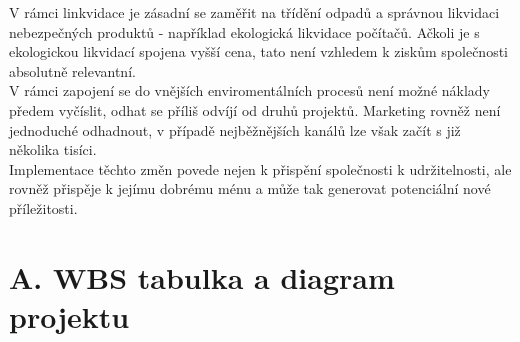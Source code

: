 V rámci linkvidace je zásadní se zaměřit na třídění odpadů a správnou likvidaci nebezpečných produktů - například ekologická likvidace počítačů. Ačkoli je s ekologickou likvidací spojena vyšší cena, tato není vzhledem k ziskům společnosti absolutně relevantní.\\

V rámci zapojení se do vnějších enviromentálních procesů není možné náklady předem vyčíslit, odhat se příliš odvíjí od druhů projektů. Marketing rovněž není jednoduché odhadnout, v případě nejběžnějších kanálů lze však začít s již několika tisíci.\\

Implementace těchto změn povede nejen k přispění společnosti k udržitelnosti, ale rovněž přispěje k jejímu dobrému ménu a může tak generovat potenciální nové příležitosti.\\

\newpage

\section*{A. WBS tabulka a diagram projektu}
\label{sec:WBS}

